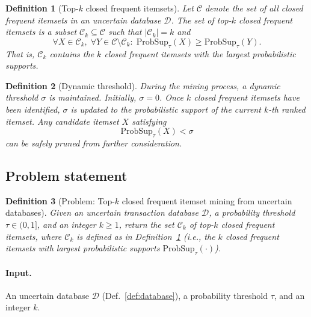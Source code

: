 \documentclass[10pt,letterpaper]{article}
\newtheorem{definition}{Definition}[section]
\newcounter{definition}
\begin{document}
\begin{definition}[Top-$k$ closed frequent itemsets]
\label{def:topk}
Let $\mathcal{C}$ denote the set of all closed frequent itemsets in an uncertain database $\mathcal{D}$.  
The set of top-$k$ closed frequent itemsets is a subset $\mathcal{C}_k \subseteq \mathcal{C}$ such that $|\mathcal{C}_k| = k$ and
\begin{equation}
\forall X \in \mathcal{C}_k,\; \forall Y \in \mathcal{C} \setminus \mathcal{C}_k:\;
\mathrm{ProbSup}_{\tau}(X) \geq \mathrm{ProbSup}_{\tau}(Y).
\label{eq:topk_def}
\end{equation}
That is, $\mathcal{C}_k$ contains the $k$ closed frequent itemsets with the largest probabilistic supports.
\end{definition}

\begin{definition}[Dynamic threshold]
\label{def:dyn_threshold}
During the mining process, a dynamic threshold $\sigma$ is maintained. Initially, $\sigma = 0$.  
Once $k$ closed frequent itemsets have been identified, $\sigma$ is updated to the probabilistic support of the current $k$-th ranked itemset.  
Any candidate itemset $X$ satisfying
\begin{equation}
\mathrm{ProbSup}_{\tau}(X) < \sigma
\label{eq:threshold_prune}
\end{equation}
can be safely pruned from further consideration.
\end{definition}

\subsection*{Problem statement}
\label{subsec:problem_statement}

\begin{definition}[Problem: Top-$k$ closed frequent itemset mining from uncertain databases]
\label{def:problem_topk}
Given an uncertain transaction database $\mathcal{D}$, a probability threshold $\tau\in(0,1]$, and an integer $k\ge 1$, return the set $\mathcal{C}_k$ of top-$k$ closed frequent itemsets, where $\mathcal{C}_k$ is defined as in Definition~\ref{def:topk} (i.e., the $k$ closed frequent itemsets with largest probabilistic supports $\mathrm{ProbSup}_{\tau}(\cdot)$).
\end{definition}

\paragraph{Input.} An uncertain database $\mathcal{D}$ (Def.~\ref{def:database}), a probability threshold $\tau$, and an integer $k$.
\end{document}
